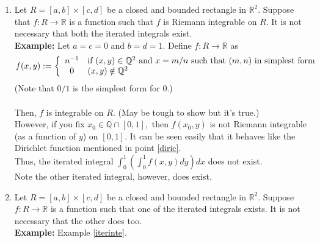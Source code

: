 \documentclass{article}
\begin{document}
\begin{enumerate}
	\item \label{iterinte} Let $R = [a, b] \times[c, d]$ be a closed and bounded rectangle in $\mathbb{R}^2.$ Suppose that $f:R\to\mathbb{R}$ is a function such that $f$ is Riemann integrable on $R.$ It is not necessary that both the iterated integrals exist.\\
	\textbf{Example:} Let $a = c = 0$ and $b = d = 1.$ Define $f:R\to\mathbb{R}$ as
	\[f(x, y) := \left\{
	\begin{array}{c l}
		n^{-1} & \text{if }(x, y) \in \mathbb{Q}^2 \text{ and } x = m/n \text{ such that } (m, n) \text{ in simplest form} \\
		0 & (x, y) \notin \mathbb{Q}^2	
	\end{array}
	\right.\]
	(Note that $0/1$ is the simplest form for $0.$)\\~\\
	Then, $f$ is integrable on $R.$ (May be tough to show but it's true.)\\
	However, if you fix $x_0 \in \mathbb{Q}\cap[0, 1],$ then $f(x_0, y)$ is not Riemann integrable (as a function of $y$) on $[0, 1].$ It can be seen easily that it behaves like the Dirichlet function mentioned in point \ref{diric}.\\
	Thus, the iterated integral $\displaystyle\int_{0}^{1} \left(\int_{0}^{1} f(x, y) dy \right) dx $ does not exist.\\
	Note the other iterated integral, however, does exist.
	\item Let $R = [a, b] \times[c, d]$ be a closed and bounded rectangle in $\mathbb{R}^2.$ Suppose $f:R\to\mathbb{R}$ is a function such that one of the iterated integrals exists. It is not necessary that the other does too.\\
	\textbf{Example:} Example \ref{iterinte}.
\end{enumerate}
\end{document}

